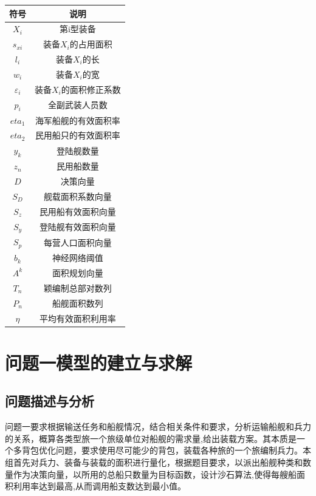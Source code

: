 \documentclass{whutmod}
\begin{document}
	\begin{table}[H]
	\label{biao} \centering
		\begin{tabular}{cc}
			\toprule[1.5pt]
			\multicolumn{1}{m{5cm}}{\centering 符号} & \multicolumn{1}{m{5cm}}{\centering 说明} \\
			\midrule[1pt]		
			$X_{i}$  &  第i型装备 \\ 
			$s_{xi}$  &  装备$X_{i}$的占用面积 \\ 
			$l_{i}$  & 装备$X_{i}$的长\\
			$w_{i}$  &  装备$X_{i}$的宽 \\ 
		    $\varepsilon _{i}$ & 装备$X_{i}$的面积修正系数\\
			$p_{i}$	 &  全副武装人员数  \\ 
			$eta_{1}$ &  海军船舰的有效面积率 \\ 
			$eta_{2}$	 &  民用船只的有效面积率 \\ 
			$y_{k}$  &   登陆舰数量\\ 
			$z_{n}$  &  民用船数量\\	
			$D$ & 决策向量\\
			$S_{D}$ &  舰载面积系数向量\\ 
			$S_{z}$ & 民用船有效面积向量\\
			$S_{y}$ & 登陆舰有效面积向量\\
			$S_{p}$ & 每营人口面积向量\\
			$b_{k}$ & 神经网络阈值\\
			$A^{k}$  & 面积规划向量\\
			$T_{n}$ & 颖编制总部对数列\\
			$P_{n}$ & 船舰面积数列\\
			$\eta $ &  平均有效面积利用率\\

		
			\bottomrule[1.5pt]
		\end{tabular}
	\end{table}

	\section{问题一模型的建立与求解}

    \subsection{问题描述与分析}

    问题一要求根据输送任务和船舰情况，结合相关条件和要求，分析运输船舰和兵力的关系，概算各类型旅一个旅级单位对船舰的需求量,给出装载方案。其本质是一个多背包优化问题，要求使用尽可能少的背包，装载各种旅的一个旅编制兵力。本组首先对兵力、装备与装载的面积进行量化，根据题目要求，以派出船舰种类和数量作为决策向量，以所用的总船只数量为目标函数，设计沙石算法,使得每艘船面积利用率达到最高,从而调用船支数达到最小值。
    
\end{document}
